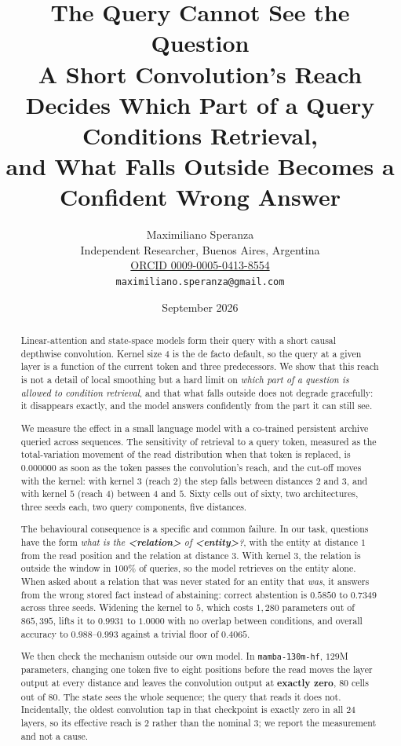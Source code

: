 \documentclass[11pt,a4paper]{article}
\title{\bfseries The Query Cannot See the Question\\
\large A Short Convolution's Reach Decides Which Part of a Query Conditions Retrieval,\\
and What Falls Outside Becomes a Confident Wrong Answer}
\author{Maximiliano Speranza\\
\small Independent Researcher, Buenos Aires, Argentina\\
\small \href{https://orcid.org/0009-0005-0413-8554}{ORCID 0009-0005-0413-8554}\\
\small \texttt{maximiliano.speranza@gmail.com}}
\date{September 2026}
\begin{document}
\maketitle

\begin{abstract}
\noindent
Linear-attention and state-space models form their query with a short causal depthwise convolution.
Kernel size $4$ is the de facto default, so the query at a given layer is a function of the current
token and three predecessors. We show that this reach is not a detail of local smoothing but a hard limit on
\emph{which part of a question is allowed to condition retrieval}, and that what falls outside does
not degrade gracefully: it disappears exactly, and the model answers confidently from the part it can
still see.

We measure the effect in a small language model with a co-trained persistent archive queried across
sequences. The sensitivity of retrieval to a query token, measured as the total-variation movement of
the read distribution when that token is replaced, is $\mathbf{0.000000}$ as soon as the token passes
the convolution's reach, and the cut-off moves with the kernel: with kernel $3$ (reach $2$) the step
falls between distances $2$ and $3$, and with kernel $5$ (reach $4$) between $4$ and $5$. Sixty cells
out of sixty, two architectures, three seeds each, two query components, five distances.

The behavioural consequence is a specific and common failure. In our task, questions have the form
\emph{what is the \textbf{<relation>} of \textbf{<entity>}?}, with the entity at distance $1$ from the
read position and the relation at distance $3$. With kernel $3$, the relation is outside the window in
$100\%$ of queries, so the model retrieves on the entity alone. When asked about a relation that was
never stated for an entity that \emph{was}, it answers from the wrong stored fact instead of
abstaining: correct abstention is $0.5850$ to $0.7349$ across three seeds. Widening the kernel to $5$,
which costs $1{,}280$ parameters out of $865{,}395$, lifts it to $\mathbf{0.9931}$ to
$\mathbf{1.0000}$ with no overlap between conditions, and overall accuracy to $0.988$--$0.993$ against
a trivial floor of $0.4065$.

We then check the mechanism outside our own model. In \texttt{mamba-130m-hf}, $129$M parameters,
changing one token five to eight positions before the read moves the layer output at every distance
and leaves the convolution output at \textbf{exactly zero}, $80$ cells out of $80$. The state sees the
whole sequence; the query that reads it does not. Incidentally, the oldest convolution tap in that
checkpoint is exactly zero in all $24$ layers, so its effective reach is $2$ rather than the nominal
$3$; we report the measurement and not a cause.


\end{abstract}
\end{document}
